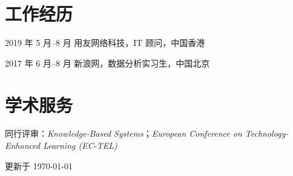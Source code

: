\documentclass[11pt,letterpaper]{report}
\begin{document}
    \section*{工作经历}

    \begin{tablist}

        \item[2019 年 5 月--8 月] \tab{}用友网络科技，IT 顾问，中国香港
        \item[2017 年 6 月--8 月] \tab{}新浪网，数据分析实习生，中国北京

    \end{tablist}

    \section*{学术服务}

    同行评审：\textit{Knowledge-Based Systems}；\textit{European Conference on Technology-Enhanced Learning (EC-TEL)}

    \begin{center}
        \vfill
        更新于 \monthyeardate\today
    \end{center}
\end{document}
